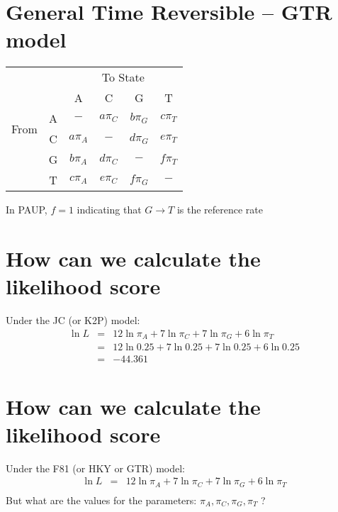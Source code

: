 \documentclass[landscape]{foils}
\begin{document}
\myNewSlide
 

\myNewSlide
\section*{General Time Reversible -- GTR model}
\begin{table}[htdp]
\begin{center}
\begin{tabular}{cc|cccc}
& & \multicolumn{4}{c}{To State} \\
& & A & C & G & T \\
\hline
\multirow{2}{*}{From } & A &  $-$ & $a\pi_C $ & $b\pi_G$ & $c\pi_T $    \\
\multirow{2}{*}{State } &C & $a\pi_A$ & $- $ & $d\pi_G$ & $e\pi_T $    \\
 & G & $b\pi_A$ & $d\pi_C $ & $-$ & $f\pi_T $    \\
 &  T & $c\pi_A$ & $e\pi_C $ & $f\pi_G$ & $- $    \\
\end{tabular}
\end{center}
\end{table}
In PAUP, $f=1$ indicating that $G\rightarrow T$ is the reference rate



\myNewSlide
 

\myNewSlide
\section*{How can we calculate the likelihood score}
\Large 
Under the JC (or K2P) model:
\begin{eqnarray*}
	\ln L & =  &  12 \ln\pi_A + 7 \ln\pi_C + 7 \ln\pi_G + 6 \ln\pi_T \\
		 & =  &  12 \ln0.25 + 7 \ln0.25 + 7 \ln0.25 + 6 \ln0.25 \\
		 & = & -44.361
\end{eqnarray*}

\myNewSlide
\section*{How can we calculate the likelihood score}
\Large 
Under the F81 (or HKY or GTR) model:
\begin{eqnarray*}
	\ln L & =  &  12 \ln\pi_A + 7 \ln\pi_C + 7 \ln\pi_G + 6 \ln\pi_T \\
\end{eqnarray*}
But what are the values for the parameters: $\pi_A, \pi_C, \pi_G, \pi_T$ ?
\end{document}
